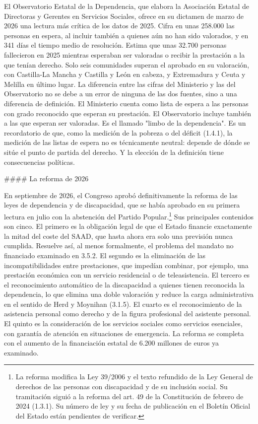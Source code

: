 \documentclass[10pt,a4paper]{article}
\begin{document}
El Observatorio Estatal de la Dependencia, que elabora la Asociación Estatal de Directoras y Gerentes en Servicios Sociales, ofrece en su dictamen de marzo de 2026 una lectura más crítica de los datos de 2025. Cifra en unas 258.000 las personas en espera, al incluir también a quienes aún no han sido valorados, y en 341 días el tiempo medio de resolución. Estima que unas 32.700 personas fallecieron en 2025 mientras esperaban ser valoradas o recibir la prestación a la que tenían derecho. Solo seis comunidades superan el aprobado en su valoración, con Castilla-La Mancha y Castilla y León en cabeza, y Extremadura y Ceuta y Melilla en último lugar. La diferencia entre las cifras del Ministerio y las del Observatorio no se debe a un error de ninguna de las dos fuentes, sino a una diferencia de definición. El Ministerio cuenta como lista de espera a las personas con grado reconocido que esperan su prestación. El Observatorio incluye también a las que esperan ser valoradas. Es el llamado "limbo de la dependencia". Es un recordatorio de que, como la medición de la pobreza o del déficit (1.4.1), la medición de las listas de espera no es técnicamente neutral: depende de dónde se sitúe el punto de partida del derecho. Y la elección de la definición tiene consecuencias políticas.

#### La reforma de 2026

En septiembre de 2026, el Congreso aprobó definitivamente la reforma de las leyes de dependencia y de discapacidad, que se había aprobado en su primera lectura en julio con la abstención del Partido Popular.\footnote{La reforma modifica la Ley 39/2006 y el texto refundido de la Ley General de derechos de las personas con discapacidad y de su inclusión social. Su tramitación siguió a la reforma del art. 49 de la Constitución de febrero de 2024 (1.3.1). Su número de ley y su fecha de publicación en el Boletín Oficial del Estado están pendientes de verificar.
} Sus principales contenidos son cinco. El primero es la obligación legal de que el Estado financie exactamente la mitad del coste del SAAD, que hasta ahora era solo una previsión nunca cumplida. Resuelve así, al menos formalmente, el problema del mandato no financiado examinado en 3.5.2. El segundo es la eliminación de las incompatibilidades entre prestaciones, que impedían combinar, por ejemplo, una prestación económica con un servicio residencial o de teleasistencia. El tercero es el reconocimiento automático de la discapacidad a quienes tienen reconocida la dependencia, lo que elimina una doble valoración y reduce la carga administrativa en el sentido de Herd y Moynihan (3.1.5). El cuarto es el reconocimiento de la asistencia personal como derecho y de la figura profesional del asistente personal. El quinto es la consideración de los servicios sociales como servicios esenciales, con garantía de atención en situaciones de emergencia. La reforma se completa con el aumento de la financiación estatal de 6.200 millones de euros ya examinado.
\end{document}

